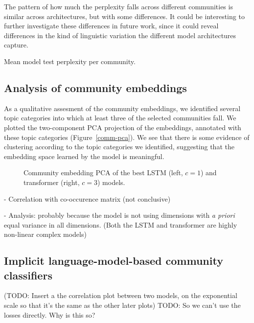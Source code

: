 \documentclass[11pt,a4paper]{article}
\begin{document}
The pattern of how much the perplexity falls across different communities
is similar across architectures, but with some differences.
It could be interesting to further investigate these differences in future work,
since it could reveal differences in the kind of linguistic variation the different
model architectures capture.

\begin{table*}
  \footnotesize
  \centering
  
  \caption{Mean model test perplexity per community.}
  \label{tab:model-ppls}
\end{table*}

\subsection{Analysis of community embeddings}

As a qualitative assesment of the community embeddings, 
we identified several topic categories into which at least three
of the selected communities fall. 
We plotted the two-component PCA projection of the embeddings,
annotated with these topic categories (Figure~\ref{comm-pca}).
We see that there is some evidence of clustering according to
the topic categories we identified,
suggesting that the embedding space learned by the model is meaningful.

\begin{figure*}
\caption{Community embedding PCA of the best LSTM (left, $c=1$) and transformer (right, $c=3$) models.}
\label{fig:comm-pca}
\end{figure*}

- Correlation with co-occurence matrix (not conclusive)

- Analysis: probably because the model is not using dimensions
with \emph{a priori} equal variance in all dimensions. (Both the LSTM and transformer are highly non-linear complex models)

\subsection{Implicit language-model-based community classifiers}

(TODO: Insert a the correlation plot between two models, on the exponential scale so that it's the same as the other later plots)
TODO: So we can't use the losses directly. Why is this so?
\end{document}

